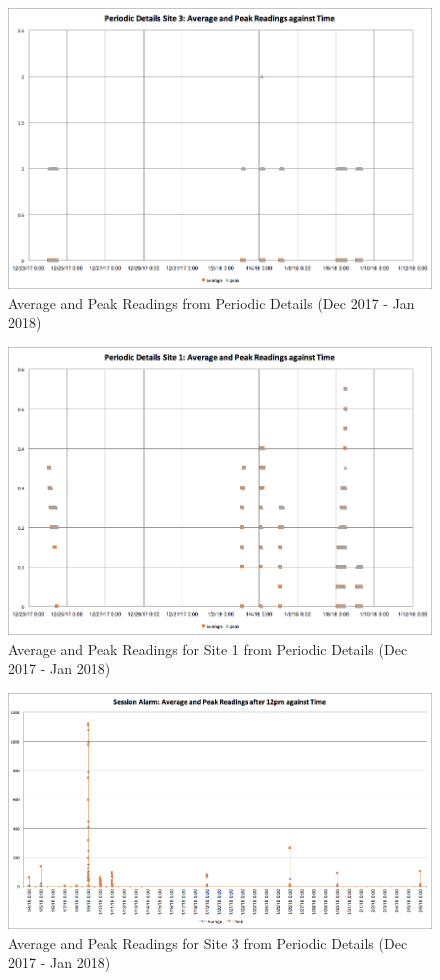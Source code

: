 \documentclass[twoside,twocolumn]{article}
\begin{document}
\begin{figure}
\includegraphics[width=15.1cm]{images/image5.png}
\caption{Average and Peak Readings from Periodic Details (Dec 2017 - Jan 2018)}
\end{figure}
\begin{figure}
\includegraphics[width=15.1cm]{images/image4.png}
\caption{Average and Peak Readings for Site 1 from Periodic Details  (Dec 2017 - Jan 2018)}
\end{figure}
\begin{figure}
\includegraphics[width=15.1cm]{images/image2.png}
\caption{Average and Peak Readings for Site 3 from Periodic Details (Dec 2017 - Jan 2018)}
\end{figure}
\end{document}
